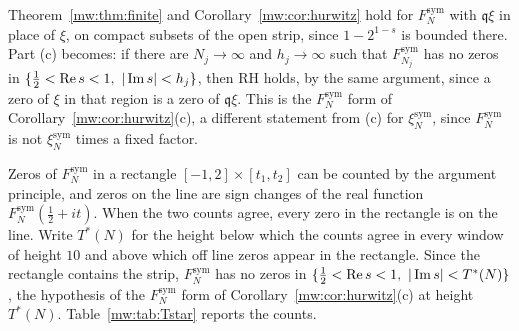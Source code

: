 Theorem~\ref{mw:thm:finite} and Corollary~\ref{mw:cor:hurwitz} hold for $F_N^{\mathrm{sym}}$ with $\mathfrak q\xi$ in place of $\xi$, on compact subsets of the open strip, since $1-2^{1-s}$ is bounded there. Part (c) becomes: if there are $N_j\to\infty$ and $h_j\to\infty$ such that $F^{\mathrm{sym}}_{N_j}$ has no zeros in $\{\frac12<\re s<1,\ |\im s|<h_j\}$, then RH holds, by the same argument, since a zero of $\xi$ in that region is a zero of $\mathfrak q\xi$. This is the $F_N^{\mathrm{sym}}$ form of Corollary~\ref{mw:cor:hurwitz}(c), a different statement from (c) for $\xi_N^{\mathrm{sym}}$, since $F_N^{\mathrm{sym}}$ is not $\xi_N^{\mathrm{sym}}$ times a fixed factor.

Zeros of $F_N^{\mathrm{sym}}$ in a rectangle $[-1,2]\times[t_1,t_2]$ can be counted by the argument principle, and zeros on the line are sign changes of the real function $F_N^{\mathrm{sym}}(\tfrac12+it)$. When the two counts agree, every zero in the rectangle is on the line. Write $T^*(N)$ for the height below which the counts agree in every window of height $10$ and above which off line zeros appear in the rectangle. Since the rectangle contains the strip, $F_N^{\mathrm{sym}}$ has no zeros in $\{\tfrac12<\re s<1,\ |\im s|<T^*(N)\}$, the hypothesis of the $F_N^{\mathrm{sym}}$ form of Corollary~\ref{mw:cor:hurwitz}(c) at height $T^*(N)$. Table~\ref{mw:tab:Tstar} reports the counts.

